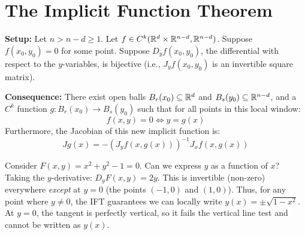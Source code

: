 \hrulefill

\section{The Implicit Function Theorem}

\begin{theorem*}
\textbf{Setup:} Let $n > n-d \ge 1$. Let $f \in C^k(\mathbb{R}^d \times \mathbb{R}^{n-d}, \mathbb{R}^{n-d})$. Suppose $f(x_0, y_0) = 0$ for some point. 
Suppose $D_y f(x_0, y_0)$, the differential with respect to the $y$-variables, is bijective (i.e., $J_y f(x_0, y_0)$ is an invertible square matrix).

\textbf{Consequence:} There exist open balls $B_r(x_0) \subseteq \mathbb{R}^d$ and $B_s(y_0) \subseteq \mathbb{R}^{n-d}$, and a $C^k$ function $g: B_r(x_0) \to B_s(y_0)$ such that for all points in this local window:
\[ f(x,y) = 0 \iff y = g(x) \]
Furthermore, the Jacobian of this new implicit function is:
\[ Jg(x) = -\left( J_y f(x, g(x)) \right)^{-1} J_x f(x, g(x)) \]
\end{theorem*}


\begin{example*}
Consider $F(x,y) = x^2 + y^2 - 1 = 0$. Can we express $y$ as a function of $x$?
Taking the $y$-derivative: $D_y F(x,y) = 2y$.
This is invertible (non-zero) everywhere \emph{except} at $y=0$ (the points $(-1,0)$ and $(1,0)$). 
Thus, for any point where $y \ne 0$, the IFT guarantees we can locally write $y(x) = \pm\sqrt{1-x^2}$. At $y=0$, the tangent is perfectly vertical, so it fails the vertical line test and cannot be written as $y(x)$.
\end{example*}

